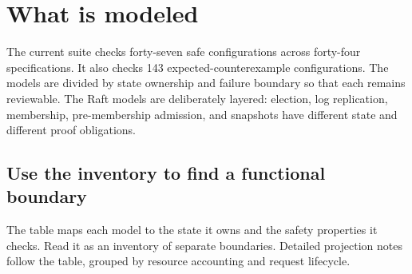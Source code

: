 \section{What is modeled}

The current suite checks forty-seven safe configurations across forty-four
specifications. It also checks 143 expected-counterexample
configurations. The models are divided by state ownership and failure boundary
so that each remains reviewable.
The Raft models are deliberately layered: election, log replication,
membership, pre-membership admission, and snapshots have different state and
different proof obligations.

\subsection{Use the inventory to find a functional boundary}

The table maps each model to the state it owns and the safety properties it
checks. Read it as an inventory of separate boundaries. Detailed projection
notes follow the table, grouped by resource accounting and request lifecycle.


